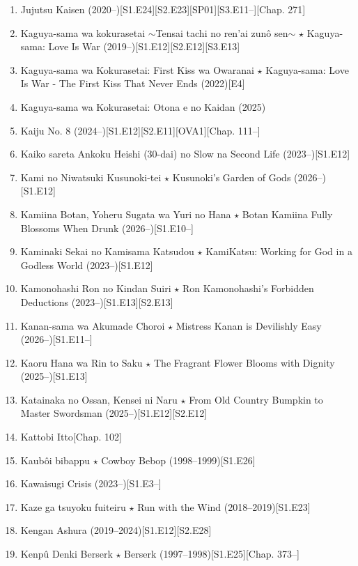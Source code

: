 \documentclass{article}
\begin{document}
\begin{enumerate}
    \item {\sc Jujutsu Kaisen} (2020--)\hfill[S1.E24][S2.E23][SP01][S3.E11--][Chap. 271]
    \item {\sc Kaguya-sama wa kokurasetai $\sim$Tensai tachi no ren'ai zun\^o sen$\sim$ $\star$ Kaguya-sama: Love Is War} (2019--)\hfill[S1.E12][S2.E12][S3.E13]
    \item {\sc Kaguya-sama wa Kokurasetai: First Kiss wa Owaranai $\star$ Kaguya-sama: Love Is War - The First Kiss That Never Ends} (2022)\hfill[E4]
    \item {\sc Kaguya-sama wa Kokurasetai: Otona e no Kaidan} (2025)
    \item {\sc Kaiju No. 8} (2024--)\hfill[S1.E12][S2.E11][OVA1][Chap. 111--]
    \item Kaiko sareta Ankoku Heishi (30-dai) no Slow na Second Life (2023--)\hfill[S1.E12]
    \item {\sc Kami no Niwatsuki Kusunoki-tei $\star$ Kusunoki's Garden of Gods} (2026--)\hfill[S1.E12]
    \item Kamiina Botan, Yoheru Sugata wa Yuri no Hana $\star$ Botan Kamiina Fully Blossoms When Drunk (2026--)\hfill[S1.E10--]
    \item {\sc Kaminaki Sekai no Kamisama Katsudou $\star$ KamiKatsu: Working for God in a Godless World} (2023--)\hfill[S1.E12]
    \item {\sc Kamonohashi Ron no Kindan Suiri $\star$ Ron Kamonohashi's Forbidden Deductions} (2023--)\hfill[S1.E13][S2.E13]
    \item Kanan-sama wa Akumade Choroi $\star$ Mistress Kanan is Devilishly Easy (2026--)\hfill[S1.E11--]
    \item {\sc Kaoru Hana wa Rin to Saku $\star$ The Fragrant Flower Blooms with Dignity} (2025--)\hfill[S1.E13]
    \item {\sc Katainaka no Ossan, Kensei ni Naru $\star$ From Old Country Bumpkin to Master Swordsman} (2025--)\hfill[S1.E12][S2.E12]
    \item {\sc Kattobi Itto}\hfill[Chap. 102]
    \item {\sc Kaub\^oi bibappu $\star$ Cowboy Bebop} (1998--1999)\hfill[S1.E26]
    \item Kawaisugi Crisis (2023--)\hfill[S1.E3--]
    \item {\sc Kaze ga tsuyoku fuiteiru $\star$ Run with the Wind} (2018--2019)\hfill[S1.E23]
    \item {\sc Kengan Ashura} (2019--2024)\hfill[S1.E12][S2.E28]
    \item {\sc Kenp\^u Denki Berserk $\star$ Berserk} (1997--1998)\hfill[S1.E25][Chap. 373--]


\end{enumerate}
\end{document}
